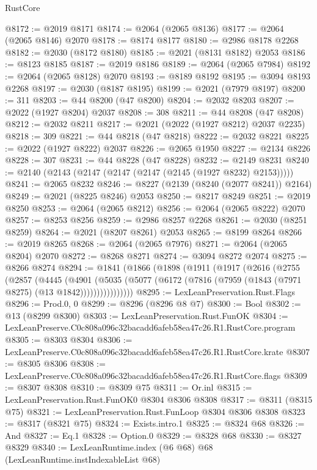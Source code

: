 \begin{lexlean}{RustCore}
\begin{coremodule}
@8172 := @2019 @8171
@8174 := @2064 (@2065 @8136)
@8177 := @2064 (@2065 @8146) @2070
@8178 := @8174 @8177
@8180 := @2986 @8178 @2268
@8182 := @2030 (@8172 @8180)
@8185 := @2021 (@8131 @8182) @2053
@8186 := @8123 @8185
@8187 := @2019 @8186
@8189 := @2064 (@2065 @7984)
@8192 := @2064 (@2065 @8128) @2070
@8193 := @8189 @8192
@8195 := @3094 @8193 @2268
@8197 := @2030 (@8187 @8195)
@8199 := @2021 (@7979 @8197)
@8200 := 311
@8203 := @44 @8200 (@47 @8200)
@8204 := @2032 @8203
@8207 := @2022 (@1927 @8204) @2037
@8208 := 308
@8211 := @44 @8208 (@47 @8208)
@8212 := @2032 @8211
@8217 := @2021 (@2022 (@1927 @8212) @2037 @2235)
@8218 := 309
@8221 := @44 @8218 (@47 @8218)
@8222 := @2032 @8221
@8225 := @2022 (@1927 @8222) @2037
@8226 := @2065 @1950
@8227 := @2134 @8226
@8228 := 307
@8231 := @44 @8228 (@47 @8228)
@8232 := @2149 @8231
@8240 := @2140 (@2143 (@2147 (@2147 (@2147 (@2145 (@1927 @8232) @2153)))))
@8241 := @2065 @8232
@8246 := @8227 (@2139 (@8240 (@2077 @8241)) @2164)
@8249 := @2021 (@8225 @8246) @2053
@8250 := @8217 @8249
@8251 := @2019 @8250
@8253 := @2064 (@2065 @8212)
@8256 := @2064 (@2065 @8222) @2070
@8257 := @8253 @8256
@8259 := @2986 @8257 @2268
@8261 := @2030 (@8251 @8259)
@8264 := @2021 (@8207 @8261) @2053
@8265 := @8199 @8264
@8266 := @2019 @8265
@8268 := @2064 (@2065 @7976)
@8271 := @2064 (@2065 @8204) @2070
@8272 := @8268 @8271
@8274 := @3094 @8272 @2074
@8275 := @8266 @8274
@8294 := @1841
    (@1866
      (@1898
        (@1911
          (@1917
            (@2616
              (@2755
                (@2857
                  (@4445
                    (@4901
                      (@5035
                        (@5077 (@6172 (@7816 (@7959 (@1843 (@7971 @8275) (@13 @1842))))))))))))))))
@8295 := LexLeanPreservation.Rust.Flags
@8296 := Prod.{0, 0}
@8299 := @8296 (@8296 @8 @7)
@8300 := Bool
@8302 := @13 (@8299 @8300)
@8303 := LexLeanPreservation.Rust.FunOK
@8304 := LexLeanPreserve.C0c808a096c32bacadd6afeb58ea47c26.R1.RustCore.program
@8305 := @8303 @8304
@8306 := LexLeanPreserve.C0c808a096c32bacadd6afeb58ea47c26.R1.RustCore.krate
@8307 := @8305 @8306
@8308 := LexLeanPreserve.C0c808a096c32bacadd6afeb58ea47c26.R1.RustCore.flags
@8309 := @8307 @8308
@8310 := @8309 @75
@8311 := Or.inl
@8315 := LexLeanPreservation.Rust.FunOK0 @8304 @8306 @8308
@8317 := @8311 (@8315 @75)
@8321 := LexLeanPreservation.Rust.FunLoop @8304 @8306 @8308
@8323 := @8317 (@8321 @75)
@8324 := Exists.intro.{1}
@8325 := @8324 @68
@8326 := And
@8327 := Eq.{1}
@8328 := Option.{0}
@8329 := @8328 @68
@8330 := @8327 @8329
@8340 := LexLeanRuntime.index
    (@6 @68)
    @68
    (LexLeanRuntime.instIndexableList @68)

\end{coremodule}
\end{lexlean}
